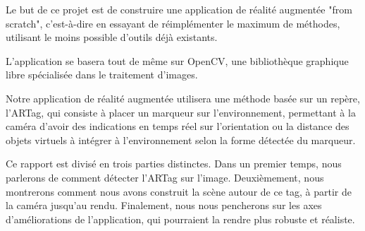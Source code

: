 
Le but de ce projet est de construire une application de réalité augmentée "from scratch", c'est-à-dire en essayant de réimplémenter le maximum de méthodes, utilisant le moins possible d'outils déjà existants.

L'application se basera tout de même sur OpenCV, une bibliothèque graphique libre spécialisée dans le traitement d'images.

Notre application de réalité augmentée utilisera une méthode basée sur un repère, l'ARTag, qui consiste à placer un marqueur sur l'environnement, permettant à la caméra d'avoir des indications en temps réel sur l'orientation ou la distance des objets virtuels à intégrer à l'environnement selon la forme détectée du marqueur. 

Ce rapport est divisé en trois parties distinctes. Dans un premier temps, nous parlerons de comment détecter l'ARTag sur l'image. Deuxièmement, nous montrerons comment nous avons construit la scène autour de ce tag, à partir de la caméra jusqu'au rendu. Finalement, nous nous pencherons sur les axes d'améliorations de l'application, qui pourraient la rendre plus robuste et réaliste.